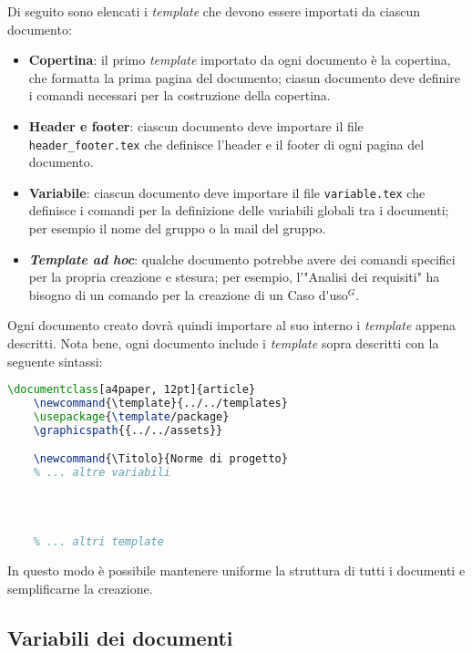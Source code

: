 Di seguito sono elencati i \textit{template} che devono essere importati da
ciascun documento:
\begin{itemize}
	\item \textbf{Copertina}: il primo \textit{template} importato da ogni
	      documento è la copertina, che formatta la prima pagina del documento;
	      ciasun documento deve definire i comandi necessari per la costruzione
	      della copertina.

	\item \textbf{Header e footer}: ciascun documento deve importare il file
	      \texttt{header\_footer.tex} che definisce l'header e il footer di ogni
	      pagina del documento.

	\item \textbf{Variabile}: ciascun documento deve importare il file
	      \texttt{variable.tex} che definisce i comandi per la definizione delle
	      variabili globali tra i documenti; per esempio il nome del gruppo o la
	      mail del gruppo.

	\item \textbf{\textit{Template ad hoc}}: qualche documento potrebbe avere
	      dei comandi specifici per la propria creazione e stesura; per esempio,
	      l'"Analisi dei requisiti" ha bisogno di un comando per la creazione di
	      un \gls{Caso d'uso}$^G$.
\end{itemize}
Ogni documento creato dovrà quindi importare al suo interno i \textit{template}
appena descritti.
Nota bene, ogni documento include i \textit{template} sopra descritti con la
seguente sintassi:
\begin{lstlisting}[language=TeX]
	\documentclass[a4paper, 12pt]{article}
	\newcommand{\template}{../../templates}
	\usepackage{\template/package}
	\graphicspath{{../../assets}}

	\newcommand{\Titolo}{Norme di progetto}
	% ... altre variabili

	
	
	
	% ... altri template
\end{lstlisting}

In questo modo è possibile mantenere uniforme la struttura di tutti i
documenti e semplificarne la creazione.

\subsection{Variabili dei documenti}

